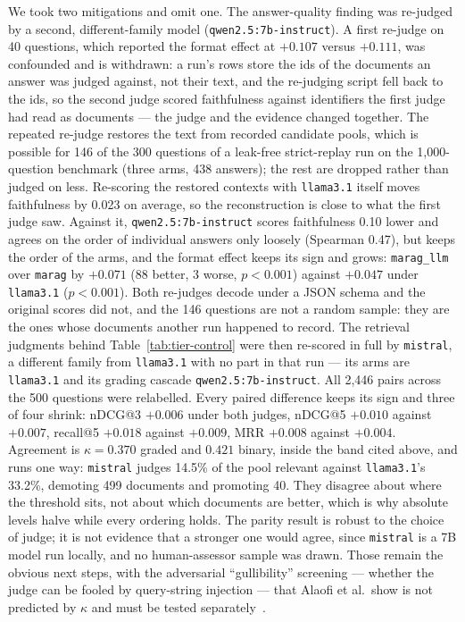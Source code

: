 \documentclass[acmsmall,review,anonymous,screen]{acmart}
\begin{document}
We took two mitigations and omit one. The answer-quality finding was re-judged
by a second, different-family model (\texttt{qwen2.5:7b-instruct}). A first
re-judge on 40 questions, which reported the format effect at $+0.107$ versus
$+0.111$, was confounded and is withdrawn: a run's rows store the ids of the
documents an answer was judged against, not their text, and the re-judging
script fell back to the ids, so the second judge scored faithfulness against
identifiers the first judge had read as documents --- the judge and the evidence
changed together. The repeated re-judge restores the text from recorded
candidate pools, which is possible for 146 of the 300 questions of a leak-free
strict-replay run on the 1{,}000-question benchmark (three arms, 438 answers);
the rest are dropped rather than judged on less. Re-scoring the restored
contexts with \texttt{llama3.1} itself moves faithfulness by 0.023 on average,
so the reconstruction is close to what the first judge saw. Against it,
\texttt{qwen2.5:7b-instruct} scores faithfulness 0.10 lower and agrees on the
order of individual answers only loosely (Spearman 0.47), but keeps the order
of the arms, and the format effect keeps its sign and grows:
\texttt{marag\_llm} over \texttt{marag} by $+0.071$ (88 better, 3 worse,
$p<0.001$) against $+0.047$ under \texttt{llama3.1} ($p<0.001$). Both
re-judges decode under a JSON schema and the original scores did not, and the
146 questions are not a random sample: they are the ones whose documents
another run happened to record. The retrieval judgments behind
Table~\ref{tab:tier-control} were then re-scored in full by \texttt{mistral}, a
different family from \texttt{llama3.1} with no part in that run --- its arms are
\texttt{llama3.1} and its grading cascade \texttt{qwen2.5:7b-instruct}. All
2{,}446 pairs across the 500 questions were relabelled.
Every paired difference keeps its sign and three of four shrink: nDCG@3 $+0.006$
under both judges, nDCG@5 $+0.010$ against $+0.007$, recall@5 $+0.018$ against
$+0.009$, MRR $+0.008$ against $+0.004$. Agreement is $\kappa=0.370$ graded and $0.421$
binary, inside the band cited above, and runs one way: \texttt{mistral} judges
14.5\% of the pool relevant against \texttt{llama3.1}'s 33.2\%, demoting 499
documents and promoting 40. They disagree about where the threshold sits, not
about which documents are better, which is why absolute levels halve while every
ordering holds. The parity result is robust to the choice of judge; it is not
evidence that a stronger one would agree, since \texttt{mistral} is a 7B model
run locally, and no human-assessor sample was drawn. Those remain the
obvious next steps, with the adversarial ``gullibility'' screening --- whether
the judge can be fooled by query-string injection --- that Alaofi et al.\ show
is not predicted by $\kappa$ and must be tested
separately~\cite{alaofi2024fooled}.
\end{document}
